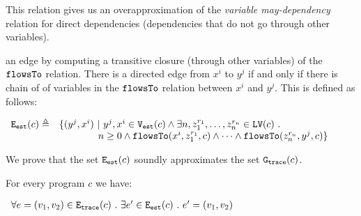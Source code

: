 This relation gives us an overapproximation of the \emph{variable may-dependency} relation for direct dependencies (dependencies that do not go through other variables).


 an edge by computing a transitive closure (through other variables) of the  
 $\mathtt{flowsTo}$ relation. There is a directed edge from  $x^i$ to $y^j$ if and only if there is chain of of variables 
    in the $\mathtt{flowsTo}$ relation between $x^i$ and $y^j$. This is defined as follows:
   \begin{center}
$
\begin{array}{cl}
    \mathtt{{E_{est}}}(c) \triangleq &
    \{ 
    (y^j, x^i)  ~ \vert ~ y^j, x^i \in \mathtt{{V_{est}}}(c)
    \land
      \exists n, z_1^{r_1}, \ldots, z_n^{r_n} \in \mathtt{LV}(c) ~.~ 
    \\ 
    & \qquad \qquad
      n \geq 0 \land
      \mathtt{flowsTo}(x^i,  z_1^{r_1}, c) 
      \land \cdots \land \mathtt{flowsTo}(z_n^{r_n}, y^j, c) 
    \}
    \end{array}
$
\end{center}    
We prove that the set $\mathtt{{E_{est}}}(c)$ soundly approximates the set $\mathtt{{G_{trace}}}(c)$.
	\begin{lem}
	\label{lem:edge_map}
	For every program $c$ we have:
   \begin{center}
$
	\begin{array}{l}
	\forall e = (v_1, v_2) \in \mathtt{{E_{trace}}}(c)
	~.~ 
	\exists e' \in \mathtt{{E_{est}}}(c) ~.~ e' = (v_1, v_2)
	\end{array}
$
\end{center} 
	\end{lem}

